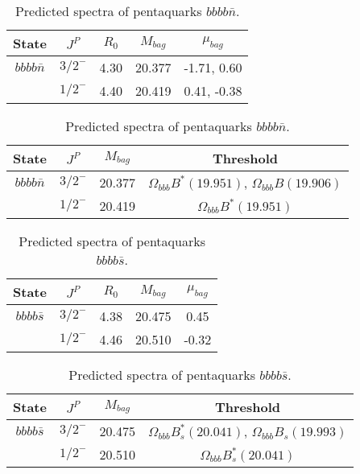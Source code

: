 \documentclass[prd,twocolumn,floatfix,nofootinbib]{revtex4}
\begin{document}
\renewcommand{\tabcolsep}{0.5cm}
\renewcommand{\arraystretch}{1.2}
\begin{table*}[!htbp]
    \caption{Predicted spectra of pentaquarks $bbbb\bar{n}$.}
    \begin{tabular}{ccccc}
        \hline\hline
        {\rm State} &$J^{P}$ &$R_{0}$ &$M_{bag}$ &$\mu_{bag}$ \\ \hline
        ${bbbb\bar{n}}$
            &${3/2}^{-}$    &4.30   &20.377 &-1.71, 0.60 \\
            &${1/2}^{-}$    &4.40   &20.419 &0.41, -0.38 \\
        \hline\hline
    \end{tabular}
\end{table*}

\renewcommand{\tabcolsep}{0.5cm}
\renewcommand{\arraystretch}{1.2}
\begin{table*}[!htbp]
    \caption{Predicted spectra of pentaquarks $bbbb\bar{n}$.}
    \begin{tabular}{cccc}
        \hline\hline
        {\rm State} &$J^{P}$ &$M_{bag}$ &Threshold \\ \hline
        ${bbbb\bar{n}}$
            &${3/2}^{-}$    &20.377 &$\Omega_{bbb} B^{\ast}(19.951)$, $\Omega_{bbb} B(19.906)$ \\
            &${1/2}^{-}$    &20.419 &$\Omega_{bbb} B^{\ast}(19.951)$ \\
        \hline\hline
    \end{tabular}
\end{table*}

\renewcommand{\tabcolsep}{0.5cm}
\renewcommand{\arraystretch}{1.2}
\begin{table*}[!htbp]
    \caption{Predicted spectra of pentaquarks $bbbb\bar{s}$.}
    \begin{tabular}{ccccc}
        \hline\hline
        {\rm State} &$J^{P}$ &$R_{0}$ &$M_{bag}$ &$\mu_{bag}$ \\ \hline
        ${bbbb\bar{s}}$
            &${3/2}^{-}$    &4.38   &20.475 &0.45 \\
            &${1/2}^{-}$    &4.46   &20.510 &-0.32 \\
        \hline\hline
    \end{tabular}
\end{table*}

\renewcommand{\tabcolsep}{0.5cm}
\renewcommand{\arraystretch}{1.2}
\begin{table*}[!htbp]
    \caption{Predicted spectra of pentaquarks $bbbb\bar{s}$.}
    \begin{tabular}{cccc}
        \hline\hline
        {\rm State} &$J^{P}$ &$M_{bag}$ &Threshold \\ \hline
        ${bbbb\bar{s}}$
            &${3/2}^{-}$    &20.475 &$\Omega_{bbb} B^{\ast}_{s}(20.041)$, $\Omega_{bbb} B_{s}(19.993)$ \\
            &${1/2}^{-}$    &20.510 &$\Omega_{bbb} B^{\ast}_{s}(20.041)$ \\
        \hline\hline
    \end{tabular}
\end{table*}
\end{document}
